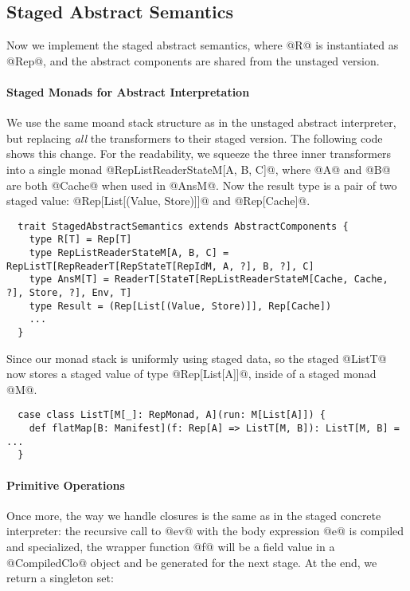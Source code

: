 \subsection{Staged Abstract Semantics}

Now we implement the staged abstract semantics, where @R@ is instantiated as
@Rep@, and the abstract components are shared from the unstaged version.

\paragraph{Staged Monads for Abstract Interpretation}
We use the same moand stack structure as in the unstaged abstract interpreter,
but replacing \textit{all} the transformers to their staged version. The
following code shows this change. For the readability, we squeeze the three
inner transformers into a single monad @RepListReaderStateM[A, B, C]@, where @A@
and @B@ are both @Cache@ when used in @AnsM@. Now the result type is a pair of
two staged value: @Rep[List[(Value, Store)]]@ and @Rep[Cache]@.

\begin{lstlisting}
  trait StagedAbstractSemantics extends AbstractComponents {
    type R[T] = Rep[T]
    type RepListReaderStateM[A, B, C] = RepListT[RepReaderT[RepStateT[RepIdM, A, ?], B, ?], C]
    type AnsM[T] = ReaderT[StateT[RepListReaderStateM[Cache, Cache, ?], Store, ?], Env, T]
    type Result = (Rep[List[(Value, Store)]], Rep[Cache])
    ...
  }
\end{lstlisting}

Since our monad stack is uniformly using staged data, so the staged @ListT@ now
stores a staged value of type @Rep[List[A]]@, inside of a staged monad @M@.

\begin{lstlisting}
  case class ListT[M[_]: RepMonad, A](run: M[List[A]]) {
    def flatMap[B: Manifest](f: Rep[A] => ListT[M, B]): ListT[M, B] = ...
  }
\end{lstlisting}

\paragraph{Primitive Operations}

Once more, the way we handle closures is the same as in the staged concrete
interpreter: the recursive call to @ev@ with the body expression @e@ is compiled
and specialized, the wrapper function @f@ will be a field value in a
@CompiledClo@ object and be generated for the next stage. At the end, we return
a singleton set:

